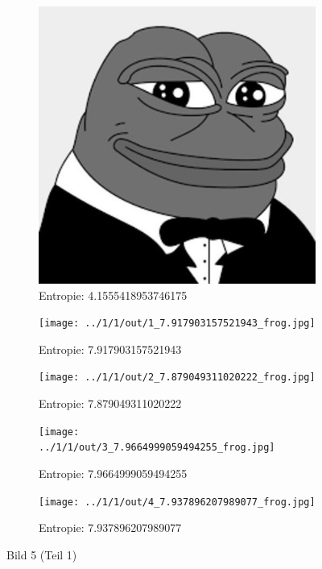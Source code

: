 \begin{figure}
	\centering

	\begin{subfigure}{0.25\textwidth}
		\includegraphics[width=\textwidth]{../1/3/gray_4.1555418953746175_frog.jpg}
		\caption{Entropie: 4.1555418953746175}
	\end{subfigure}

	\begin{subfigure}{0.25\textwidth}
		\texttt{[image: ../1/1/out/1\_7.917903157521943\_frog.jpg]}
		\caption{Entropie: 7.917903157521943}
	\end{subfigure}

	\begin{subfigure}{0.25\textwidth}
		\texttt{[image: ../1/1/out/2\_7.879049311020222\_frog.jpg]}
		\caption{Entropie: 7.879049311020222}
	\end{subfigure}

	\begin{subfigure}{0.25\textwidth}
		\texttt{[image: ../1/1/out/3\_7.9664999059494255\_frog.jpg]}
		\caption{Entropie: 7.9664999059494255}
	\end{subfigure}

	\begin{subfigure}{0.25\textwidth}
		\texttt{[image: ../1/1/out/4\_7.937896207989077\_frog.jpg]}
		\caption{Entropie: 7.937896207989077}
	\end{subfigure}
	\caption{Bild 5 (Teil 1)}
\end{figure}
